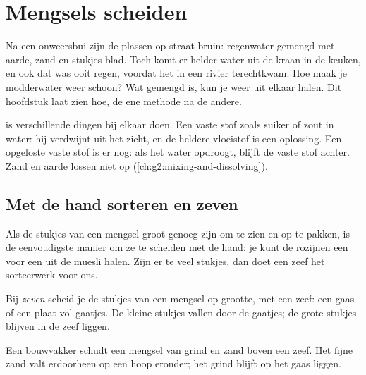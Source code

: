 \chapter{Mengsels scheiden}\label{ch:g3:separating-mixtures}

Na een onweersbui zijn de plassen op straat bruin: regenwater gemengd met
aarde, zand en stukjes blad. Toch komt er helder water uit de kraan in
de keuken, en ook dat was ooit regen, voordat het in een rivier
terechtkwam. Hoe maak je modderwater weer schoon? Wat gemengd is, kun je
weer uit elkaar halen. Dit hoofdstuk laat zien hoe, de ene methode na de
andere.

\begin{recall}
 is verschillende dingen bij elkaar doen. Een vaste stof zoals
suiker of zout  in water: hij verdwijnt uit het zicht, en de
heldere vloeistof is een oplossing. Een opgeloste vaste stof is er nog:
als het water opdroogt, blijft de vaste stof achter. Zand en aarde lossen
niet op (\cref{ch:g2:mixing-and-dissolving}).
\end{recall}

\section{Met de hand sorteren en zeven}

Als de stukjes van een mengsel groot genoeg zijn om te zien en op te
pakken, is de eenvoudigste manier om ze te scheiden met de hand: je kunt
de rozijnen een voor een uit de muesli halen. Zijn er te veel stukjes,
dan doet een zeef het sorteerwerk voor ons.

\begin{definition}[Zeven]\label{def:g3:separating-mixtures:sieve}
Bij \emph{zeven} scheid je de stukjes van een mengsel op
grootte, met een zeef: een gaas of een plaat vol gaatjes. De kleine
stukjes vallen door de gaatjes; de grote stukjes blijven in de zeef
liggen.
\end{definition}

\begin{example}\label{ex:g3:separating-mixtures:gravel}
Een bouwvakker schudt een mengsel van grind en zand boven een zeef. Het
fijne zand valt erdoorheen op een hoop eronder; het grind blijft op het
gaas liggen.
\end{example}

